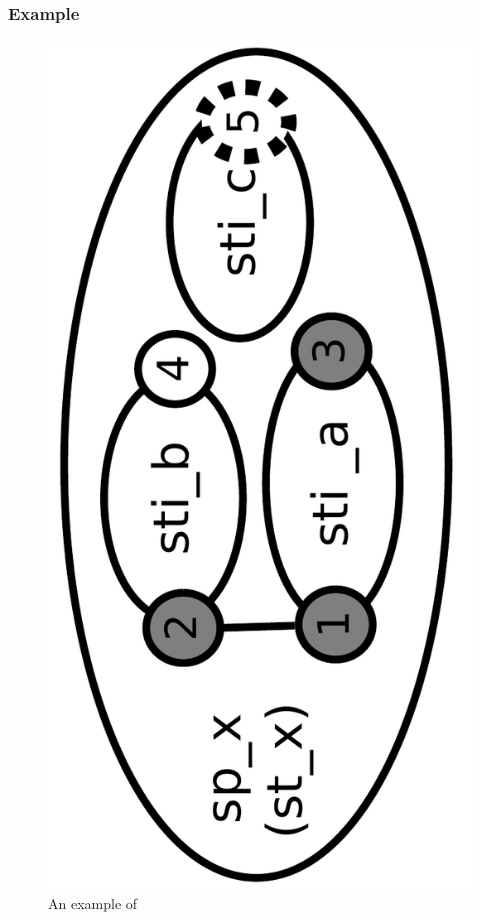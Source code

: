 \subsubsection{Example}

\begin{figure}[htb]
  \begin{center}
    \includegraphics[angle=-90, scale=0.18]{./figs/diagram_OutwardBindingSite.pdf}
    \caption{An example of \OutwardBindingSite}
    \label{fig:OutwardBindingSiteExample}
  \end{center}
\end{figure}

